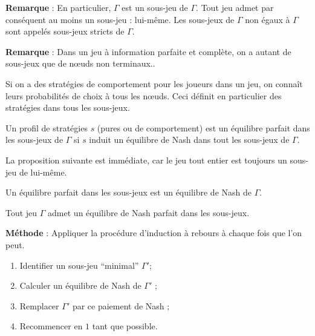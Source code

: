 {\bf Remarque} : En particulier, $\Gamma$ est un sous-jeu de
$\Gamma$. Tout jeu admet par conséquent au moins un sous-jeu :
lui-même. Les sous-jeux de $\Gamma$ non égaux à $\Gamma$ sont
appelés sous-jeux stricts de $\Gamma$.

{\bf Remarque} : Dans un jeu à information parfaite et complète,
on a autant de sous-jeux que de n{\oe}uds non terminaux..

Si on a des stratégies de comportement pour les joueurs dans un
jeu, on connaît leurs probabilités de choix à tous les n{\oe}uds.
Ceci définit en particulier des stratégies dans tous les
sous-jeux.

\begin{definition} Un profil de stratégies $s$ (pures ou de
comportement) est un équilibre parfait dans les sous-jeux de
$\Gamma$ si $s$ induit un équilibre de Nash dans tout les
sous-jeux de $\Gamma$.
\end{definition}

La proposition suivante est immédiate, car le jeu tout entier est
toujours un sous-jeu de lui-même.

\begin{proposition} Un équilibre parfait dans les sous-jeux est
un équilibre de Nash de $\Gamma$. %
\end{proposition}

\begin{proposition}
Tout jeu $\Gamma$ admet un équilibre de Nash parfait dans les
sous-jeux.
\end{proposition}

{\bf Méthode} : Appliquer la procédure d'induction à rebours à
chaque fois que l'on peut.
\begin{enumerate}
\item Identifier un sous-jeu ``minimal'' $\Gamma'$;
\item Calculer un équilibre de Nash de $\Gamma'$ ;
\item Remplacer $\Gamma'$ par ce paiement de Nash ;
\item Recommencer en $1$ tant que possible.
\end{enumerate}
